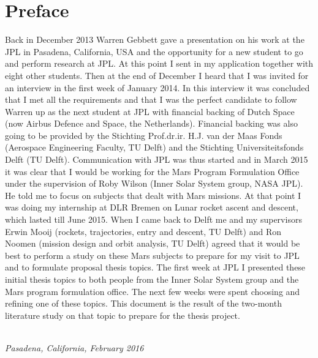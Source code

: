 \chapter*{Preface} %

Back in December 2013 Warren Gebbett gave a presentation on his work at the \ac{JPL} in Pasadena, California, USA and the opportunity for a new student to go and perform research at \ac{JPL}. At this point I sent in my application together with eight other students.  Then at the end of December I heard that I was invited for an interview in the first week of January 2014. In this interview it was concluded that I met all the requirements and that I was the perfect candidate to follow Warren up as the next student at \ac{JPL} with financial backing of Dutch Space (now Airbus Defence and Space, the Netherlands). Financial backing was also going to be provided by the Stichting Prof.dr.ir. H.J. van der Maas Fonds (Aerospace Engineering Faculty, TU Delft) and the Stichting Universiteitsfonds Delft (TU Delft). Communication with \ac{JPL} was thus started and in March 2015 it was clear that I would be working for the Mars Program Formulation Office under the supervision of Roby Wilson (Inner Solar System group, NASA \ac{JPL}). He told me to focus on subjects that dealt with Mars missions. At that point I was doing my internship at DLR Bremen on Lunar rocket ascent and descent, which lasted till June 2015. When I came back to Delft me and my supervisors Erwin Mooij (rockets, trajectories, entry and descent, TU Delft) and Ron Noomen (mission design and orbit analysis, TU Delft) agreed that it would be best to perform a study on these Mars subjects to prepare for my visit to \ac{JPL} and to formulate proposal thesis topics. The first week at \ac{JPL} I presented these initial thesis topics to both people from the Inner Solar System group and the Mars program formulation office. The next few weeks were spent choosing and refining one of these topics. This document is the result of the two-month literature study on that topic to prepare for the thesis project.


\begin{flushright}
{\makeatletter\itshape
    \@author \\
    Pasadena, California, February 2016
\makeatother}
\end{flushright}

